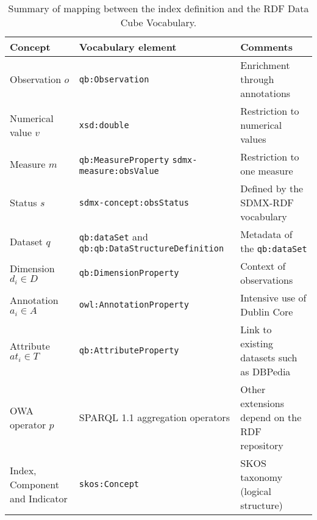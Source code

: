 \begin{table}[!htb]
\renewcommand{\arraystretch}{1.3}
\begin{center}
\begin{tabular}{|p{3cm}||p{4.8cm}|p{4.5cm}|}
\hline
  \textbf{Concept} & \textbf{Vocabulary element} &  \textbf{Comments}  \\  \hline
   Observation $o$ & \texttt{qb:Observation} &  Enrichment through annotations\\ \hline
   Numerical value $v$ & \texttt{xsd:double} & Restriction to numerical values  \\ \hline
   Measure $m$ & \texttt{qb:MeasureProperty} \texttt{sdmx-measure:obsValue} & Restriction to one measure \\ \hline
   Status $s$ & \texttt{sdmx-concept:obsStatus} & Defined by the SDMX-RDF vocabulary\\ \hline
   Dataset $q$ & \texttt{qb:dataSet} and \texttt{qb:qb:DataStructureDefinition} &  Metadata of the \texttt{qb:dataSet}\\ \hline
   Dimension $d_i \in D$ & \texttt{qb:DimensionProperty} & Context of observations \\ \hline
   Annotation $a_i \in A$ & \texttt{owl:AnnotationProperty} &  Intensive use of Dublin Core\\ \hline
   Attribute $at_i \in T$ & \texttt{qb:AttributeProperty} & Link to existing datasets such as DBPedia \\ \hline
   OWA operator $p$ &  SPARQL 1.1 aggregation operators & Other extensions depend on the RDF repository \\ \hline
   Index, Component and Indicator & \texttt{skos:Concept} & SKOS taxonomy (logical structure) \\ \hline
  \hline
  \end{tabular}
  \caption{Summary of mapping between the index definition and the RDF Data Cube Vocabulary.}
  \label{index-to-rdf}
  \end{center}
\end{table} 

